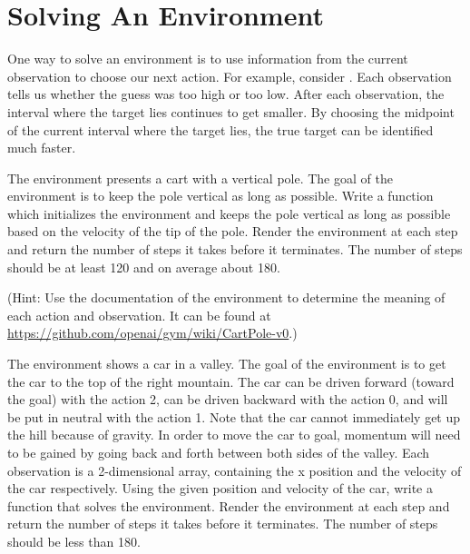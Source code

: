 \section*{Solving An Environment}

One way to solve an environment is to use information from the current observation to choose our next action.
For example, consider .
Each observation tells us whether the guess was too high or too low.
After each observation, the interval where the target lies continues to get smaller.
By choosing the midpoint of the current interval where the target lies, the true target can be identified much faster.

\begin{problem}
The environment  presents a cart with a vertical pole.
The goal of the environment is to keep the pole vertical as long as possible.
Write a function  which initializes the environment and keeps the pole vertical as long as possible based on the velocity of the tip of the pole.
Render the environment at each step and return the number of steps it takes before it terminates.
The number of steps should be at least 120 and on average about 180.


(Hint: Use the documentation of the environment to determine the meaning of each action and observation.
It can be found at \url{https://github.com/openai/gym/wiki/CartPole-v0}.)
\label{prob:cartpole}
\end{problem}

\begin{problem}
The environment  shows a car in a valley.
The goal of the environment is to get the car to the top of the right mountain.
The car can be driven forward (toward the goal) with the action 2, can be driven backward with the action 0, and will be put in neutral with the action 1.
Note that the car cannot immediately get up the hill because of gravity.
In order to move the car to goal, momentum will need to be gained by going back and forth between both sides of the valley.
Each observation is a 2-dimensional array, containing the x position and the velocity of the car respectively.
Using the given position and velocity of the car, write a function  that solves the  environment.
Render the environment at each step and return the number of steps it takes before it terminates.
The number of steps should be less than 180.


\label{prob:car}
\end{problem}

